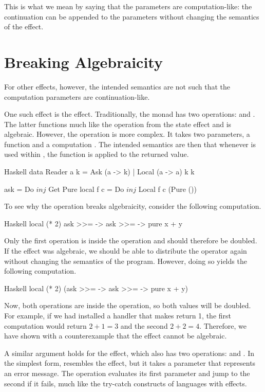 This is what we mean by saying that the parameters are computation-like: the continuation can be appended to the parameters without changing the semantics of the effect.

\section{Breaking Algebraicity}

For other effects, however, the intended semantics are not such that the computation parameters are continuation-like.

One such effect is the  effect. Traditionally, the  monad has two operations:  and . The latter functions much like the  operation from the state effect and is algebraic. However, the  operation is more complex. It takes two parameters, a function  and a computation . The intended semantics are then that whenever  is used within , the function  is applied to the returned value.

\begin{lst}{Haskell}
data Reader a k = Ask (a -> k) | Local (a -> a) k k

ask       = Do $ inj $ Get Pure
local f c = Do $ inj $ Local f c (Pure ())
\end{lst}
%
To see why the  operation breaks algebraicity, consider the following computation.

\begin{lst}{Haskell}
local (* 2) ask >>= \x -> ask >>= \y -> pure x + y
\end{lst}
%
Only the first  operation is inside the  operation and should therefore be doubled. If the  effect was algebraic, we should be able to distribute the \hs{>>=} operator again without changing the semantics of the program. However, doing so yields the following computation.

\begin{lst}{Haskell}
local (* 2) (ask >>= \x -> ask >>= \y -> pure x + y)
\end{lst}
%
Now, both  operations are inside the  operation, so both values will be doubled. For example, if we had installed a handler that makes  return 1, the first computation would return $2 + 1 = 3$ and the second $2 + 2 = 4$. Therefore, we have shown with a counterexample that the  effect cannot be algebraic.

A similar argument holds for the  effect, which also has two operations:  and . In the simplest form,  resembles the  effect, but it takes a parameter that represents an error message. The  operation evaluates its first parameter and jump to the second if it fails, much like the try-catch constructs of languages with effects.

